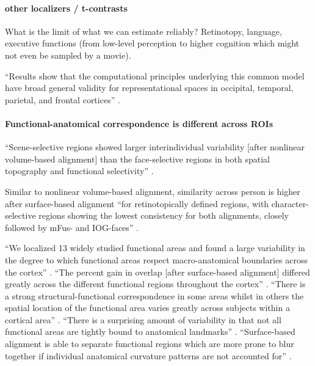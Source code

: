 \paragraph{other localizers / t-contrasts}

What is the limit of what we can estimate reliably?
%
Retinotopy, language, executive functions (from low-level perception to higher
cognition which might not even be sampled by a movie).

``Results show that the computational principles underlying this common
model have broad general validity for representational spaces in occipital,
temporal, parietal, and frontal cortices'' \citep{guntupalli2016model}.


\paragraph{Functional-anatomical correspondence is different across ROIs}

``Scene-selective regions showed larger interindividual variability [after
nonlinear volume-based alignment] than the face-selective regions in both
spatial topography and functional selectivity'' \citet{zhen2017quantifying}.


Similar to nonlinear volume-based alignment, similarity across person is higher
after surface-based alignment ``for retinotopically defined regions, with
character-selective regions showing the lowest consistency for both alignments,
closely followed by mFus- and IOG-faces'' \citep{rosenke2021probabilistic}.
%

%
``We localized 13 widely studied functional areas and found a large variability
in the degree to which functional areas respect macro-anatomical boundaries
across the cortex'' \citep{frost2012measuring}.
%
``The percent gain in overlap [after surface-based alignment] differed greatly
across the different functional regions throughout the cortex''
\citep{frost2012measuring}.
%
``There is a strong structural-functional correspondence in some areas whilst in
others the spatial location of the functional area varies greatly across
subjects within a cortical area'' \citep{frost2012measuring}.
%
``There is a surprising amount of variability in that not all functional areas
are tightly bound to anatomical landmarks'' \citep{frost2012measuring}.
%
``Surface-based alignment is able to separate functional regions which are more
prone to blur together if individual anatomical curvature patterns are not
accounted for'' \citep{frost2012measuring}.


